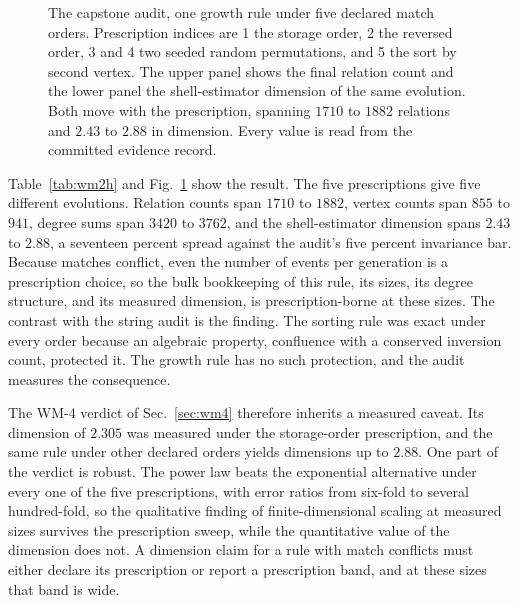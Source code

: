 \documentclass[aps,pre,reprint,nofootinbib]{revtex4-2}
\begin{document}
\begin{figure}[t]
\centering
{}
\caption{The capstone audit, one growth rule under five declared match
orders.  Prescription indices are 1 the storage order, 2 the reversed
order, 3 and 4 two seeded random permutations, and 5 the sort by
second vertex.  The upper panel shows the final relation count and the
lower panel the shell-estimator dimension of the same evolution.  Both
move with the prescription, spanning $1710$ to $1882$ relations and
$2.43$ to $2.88$ in dimension.  Every value is read from the committed
evidence record.}
\label{fig:wm2h}
\end{figure}

Table~\ref{tab:wm2h} and Fig.~\ref{fig:wm2h} show the result.  The
five prescriptions give five different evolutions.  Relation counts
span $1710$ to $1882$, vertex counts span $855$ to $941$, degree sums
span $3420$ to $3762$, and the shell-estimator dimension spans $2.43$
to $2.88$, a seventeen percent spread against the audit's five percent
invariance bar.  Because matches conflict, even the number of events
per generation is a prescription choice, so the bulk bookkeeping of
this rule, its sizes, its degree structure, and its measured
dimension, is prescription-borne at these sizes.  The contrast with
the string audit is the finding.  The sorting rule was exact under
every order because an algebraic property, confluence with a
conserved inversion count, protected it.  The growth rule has no such
protection, and the audit measures the consequence.

The WM-4 verdict of Sec.~\ref{sec:wm4} therefore inherits a measured
caveat.  Its dimension of $2.305$ was measured under the storage-order
prescription, and the same rule under other declared orders yields
dimensions up to $2.88$.  One part of the verdict is robust.  The
power law beats the exponential alternative under every one of the
five prescriptions, with error ratios from six-fold to several
hundred-fold, so the qualitative finding of finite-dimensional
scaling at measured sizes survives the prescription sweep, while the
quantitative value of the dimension does not.  A dimension claim for
a rule with match conflicts must either declare its prescription or
report a prescription band, and at these sizes that band is wide.
\end{document}
